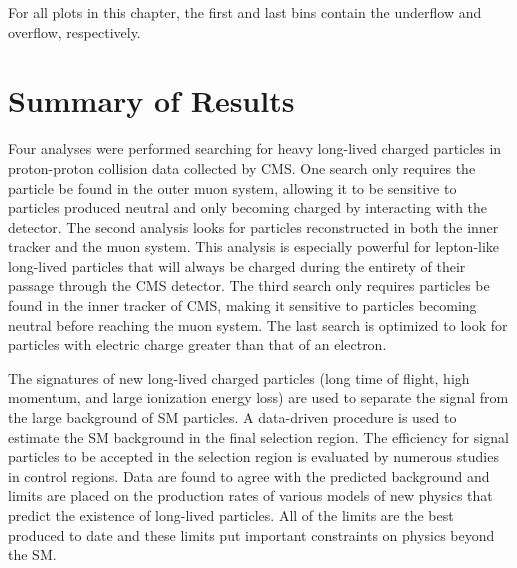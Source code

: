 For all plots in this chapter, the first and last bins contain the underflow and overflow, respectively.



















\section{Summary of Results}
Four analyses were performed searching for heavy long-lived charged particles in proton-proton collision data collected by CMS. One search only requires the particle be found
in the outer muon system, allowing it to be sensitive to particles produced neutral and only becoming charged by interacting with the detector. The second analysis looks
for particles reconstructed in both the inner tracker and the muon system. This analysis is especially powerful for lepton-like long-lived particles that will always be charged
during the entirety of their passage through the CMS detector. The third search only requires particles be found in the inner tracker of CMS, making it sensitive
to particles becoming neutral before reaching the muon system. The last search is optimized to look for particles with electric charge greater than that of
an electron.

The signatures of new long-lived charged particles (long time of flight, high momentum, and large ionization
energy loss) are used to separate the signal from the large background of SM particles.
A data-driven procedure is used to estimate the SM background in the final selection region. 
The efficiency for signal particles to be accepted in the selection region is evaluated by numerous studies in control regions.
Data are found to agree with the predicted background and limits are placed on the production rates of various models of new physics that predict
the existence of long-lived particles. All of the limits are the best produced to date and these limits put important constraints on physics beyond the SM.